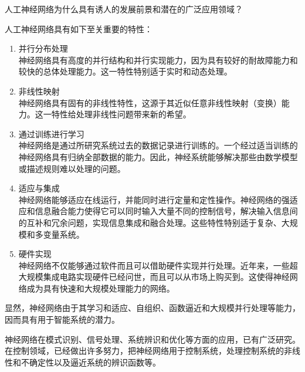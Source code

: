 \begin{question}
人工神经网络为什么具有诱人的发展前景和潜在的广泛应用领域？
\end{question}
\begin{solution}
人工神经网络具有如下至关重要的特性：
	\begin{enumerate}
		\item 并行分布处理 \\
神经网络具有高度的并行结构和并行实现能力，因为具有较好的耐故障能力和较快的总体处理能力。这一特性特别适于实时和动态处理。
		\item 非线性映射 \\
神经网络具有固有的非线性特性，这源于其近似任意非线性映射（变换）能力。这一特性给处理非线性问题带来新的希望。
		\item 通过训练进行学习 \\
神经网络是通过所研究系统过去的数据记录进行训练的。一个经过适当训练的神经网络具有归纳全部数据的能力。因此，神经系统能够解决那些由数学模型或描述规则难以处理的问题。
		\item 适应与集成 \\
神经网络能够适应在线运行，并能同时进行定量和定性操作。神经网络的强适应和信息融合能力使得它可以同时输入大量不同的控制信号，解决输入信息间的互补和冗余问题，实现信息集成和融合处理。这些特性特别适于复杂、大规模和多变量系统。
		\item 硬件实现 \\
神经网络不仅能够通过软件而且可以借助硬件实现并行处理。近年来，一些超大规模集成电路实现硬件已经问世，而且可以从市场上购买到。这使得神经网络成为具有快速和大规模处理能力的网络。
	\end{enumerate} \par
	显然，神经网络由于其学习和适应、自组织、函数逼近和大规模并行处理等能力，因而具有用于智能系统的潜力。\par
	神经网络在模式识别、信号处理、系统辨识和优化等方面的应用，已有广泛研究。在控制领域，已经做出许多努力，把神经网络用于控制系统，处理控制系统的非线性和不确定性以及逼近系统的辨识函数等。
\end{solution}

